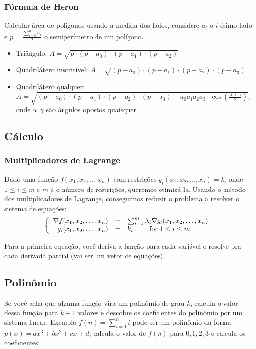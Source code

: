         \subsubsection{Fórmula de Heron}
        Calcular área de polígonos usando a medida dos lados, considere $a_i$ o $i$-ésimo lado e $p = \displaystyle \frac{\sum_{i=0}^n a_i}{2}$ o semiperímetro de um polígono.
            \begin{itemize}
                \item Triângulo: $A = \sqrt{p \cdot (p-a_0) \cdot (p-a_1) \cdot (p-a_2)}$
                \item Quadrilátero inscritível: $A = \sqrt{(p-a_0) \cdot (p-a_1) \cdot (p-a_2) \cdot (p-a_3)}$
                \item Quadrilátero qualquer: $A = \sqrt{(p-a_0) \cdot (p-a_1) \cdot (p-a_2) \cdot (p-a_3)  - a_0a_1a_2a_3 \cdot \cos(\frac{\alpha + \gamma}{2})}$, onde $\alpha,\gamma$ são ângulos opostos quaisquer
            \end{itemize}
    \subsection{Cálculo}
        \subsubsection{Multiplicadores de Lagrange}
        Dado uma função $f(x_1,x_2,\dots, x_n)$ com restrições $g_i(x_1,x_2,\dots,x_n) = k_i$ onde $1 \le i \le m$ e $m$ é o número de restrições, queremos otimizá-la. Usando o método dos multiplicadores de Lagrange, conseguimos reduzir o problema a resolver o sistema de equações:
        \[
            \left\{
            \begin{array}{{rcl}}
               \nabla f(x_1,x_2,\dots,x_n) & = & \sum_{i=1}^{m} \lambda_i \nabla g_i(x_1,x_2,\dots,x_n)  \\
                g_i(x_1,x_2,\dots,x_n)     & = & k_i \ \ \ \ \ \ \ \text{for $1 \le i \le m$}
            \end{array}
            \right.
        \]
        
        Para a primeira equação, você deriva a função para cada variável e resolve pra cada derivada parcial (vai ser um vetor de equações).

    \subsection{Polinômio}
        Se você acha que alguma função vira um polinômio de grau $k$, calcula o valor dessa função para $k+1$ valores e descobre os coeficientes do polinômio por um sistema linear. Exemplo $f(n) = \sum_{i=1}^n i$ pode ser um polinômio da forma $p(x) = ax^3 + bx^2 + cx + d$, calcula o valor de $f(n)$ para $0,1,2,3$ e calcula os coeficientes.
